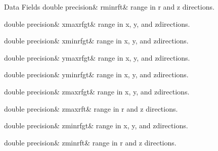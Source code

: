 \begin{DoxyFields}{Data Fields}
\mbox{\label{namespacedataclass_a50959e96924c22806be36879d08f8342}} 
double precision&
rminrft&
range in r and z directions. \\
\hline

\mbox{\label{namespacedataclass_ac91ac792a03611b9d7ea7e9491a9f932}} 
double precision&
xmaxrfgt&
range in x, y, and zdirections. \\
\hline

\mbox{\label{namespacedataclass_a48a580850e3d44d65f42d8c6a5c7892c}} 
double precision&
xminrfgt&
range in x, y, and zdirections. \\
\hline

\mbox{\label{namespacedataclass_a41bea18fe0cd9cb24dcab4f811a53d20}} 
double precision&
ymaxrfgt&
range in x, y, and zdirections. \\
\hline

\mbox{\label{namespacedataclass_a817fb5a469a1095749da14db38aaff2b}} 
double precision&
yminrfgt&
range in x, y, and zdirections. \\
\hline

\mbox{\label{namespacedataclass_aa1e1937a10ecb4f84e61ab79dfc8b0e3}} 
double precision&
zmaxrfgt&
range in x, y, and zdirections. \\
\hline

\mbox{\label{namespacedataclass_a8302c4d489f349d54ff3fa17ae25ae4a}} 
double precision&
zmaxrft&
range in r and z directions. \\
\hline

\mbox{\label{namespacedataclass_a7f273248f53c831222242a3cccedd14e}} 
double precision&
zminrfgt&
range in x, y, and zdirections. \\
\hline

\mbox{\label{namespacedataclass_a2f063280da3bc87a3bd10bdef7fce0f0}} 
double precision&
zminrft&
range in r and z directions. \\
\hline

\end{DoxyFields}
